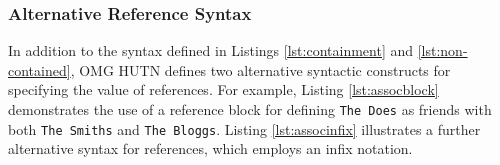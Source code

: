 % 
% 
% 


\subsubsection{Alternative Reference Syntax}
In addition to the syntax defined in Listings \ref{lst:containment} and \ref{lst:non-contained}, OMG HUTN defines two alternative syntactic constructs for specifying the value of references. For example, Listing \ref{lst:assocblock} demonstrates the use of a reference block for defining \texttt{The Does} as friends with both \texttt{The Smiths} and \texttt{The Bloggs}. Listing \ref{lst:associnfix} illustrates a further alternative syntax for references, which employs an infix notation. 

